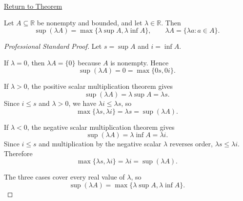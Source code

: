 \newpage
{}
\label{prf:supremum-dilation}

\begin{remark*}[Return]
\hyperref[thm:supremum-dilation]{Return to Theorem}
\end{remark*}


\begin{theorem*}
Let $A\subseteq\mathbb{R}$ be nonempty and bounded, and let $\lambda\in\mathbb{R}$. Then
\[
  \sup(\lambda A)=\max\{\lambda\sup A,\lambda\inf A\},
  \qquad
  \lambda A=\{\lambda a:a\in A\}.
\]
\end{theorem*}

\begin{proof}[Professional Standard Proof]
\LRAProofBodyStart
Let $s=\sup A$ and $i=\inf A$.

If $\lambda=0$, then $\lambda A=\{0\}$ because $A$ is nonempty. Hence
\[
  \sup(\lambda A)=0=\max\{0s,0i\}.
\]

If $\lambda>0$, the positive scalar multiplication theorem gives
\[
  \sup(\lambda A)=\lambda\sup A=\lambda s.
\]
Since $i\le s$ and $\lambda>0$, we have $\lambda i\le \lambda s$, so
\[
  \max\{\lambda s,\lambda i\}=\lambda s=\sup(\lambda A).
\]

If $\lambda<0$, the negative scalar multiplication theorem gives
\[
  \sup(\lambda A)=\lambda\inf A=\lambda i.
\]
Since $i\le s$ and multiplication by the negative scalar $\lambda$ reverses
order, $\lambda s\le \lambda i$. Therefore
\[
  \max\{\lambda s,\lambda i\}=\lambda i=\sup(\lambda A).
\]

The three cases cover every real value of $\lambda$, so
\[
  \sup(\lambda A)=\max\{\lambda\sup A,\lambda\inf A\}.
\]
\end{proof}

